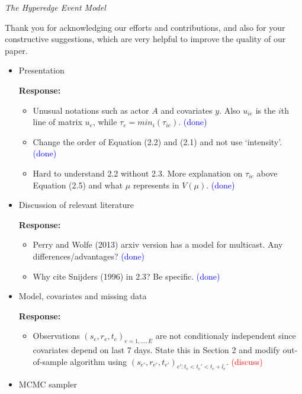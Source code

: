 \documentclass[12pt]{article}
\date{\today}
\theoremstyle{definition}
\begin{document}

\begin{center}
\textsl{The Hyperedge Event Model}
\end{center}
\iffalse
Thank you for acknowledging our efforts and contributions, and also for your constructive suggestions, which are very helpful to improve the quality of our paper. 

\begin{itemize}
	\item Presentation

	\textbf{  Response:} 
	\begin{itemize}
		\item Unusual notations such as actor $A$ and covariates $y$. Also $u_{ie}$ is the $i$th line of matrix $u_e$, while $\tau_e = min_i(\tau_{ie})$.  \textcolor{blue}{(done)}
		\item Change the order of Equation (2.2) and (2.1) and not use `intensity'. \textcolor{blue}{(done)}
		\item Hard to understand 2.2 without 2.3. More explanation on $\tau_{ie}$ above Equation (2.5) and what $\mu$ represents in $V(\mu)$. \textcolor{blue}{(done)}
	\end{itemize}

	\item Discussion of relevant literature

	\textbf{  Response:} 
	\begin{itemize}
		\item Perry and Wolfe (2013) arxiv version has a model for multicast. Any differences/advantages? \textcolor{blue}{(done)}
		\item Why cite Snijders (1996) in 2.3? Be specific. \textcolor{blue}{(done)}
	\end{itemize}
	
	\item Model, covariates and missing data
	
		\textbf{  Response:} 
		\begin{itemize}
			\item Observations $(s_e, r_e, t_e)_{e=1,\ldots,E}$ are not conditionaly independent since covariates depend on last 7 days. State this in Section 2 and modify out-of-sample algorithm using $(s_{e'}, r_{e'}, t_{e'})_{e':t_e<t_e'<t_e+l_e}$.  \textcolor{red}{(discuss)} 
		\end{itemize}
	\item MCMC sampler
	

\end{itemize}
\end{document}
